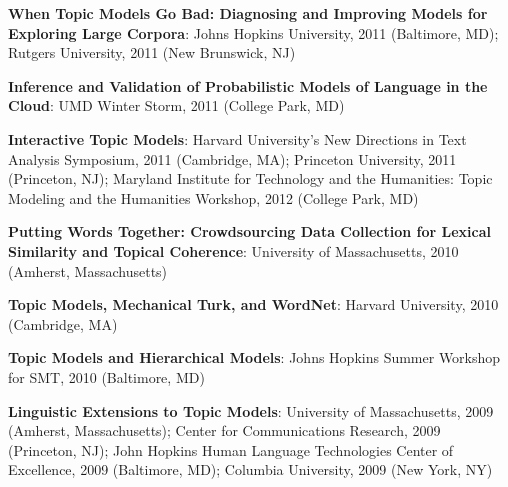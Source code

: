 \documentclass[10pt,a4paper]{article} %
\begin{document}
{\begin{enumerate*}
	\item {\bf When Topic Models Go Bad: Diagnosing and Improving Models for Exploring Large Corpora}: Johns Hopkins University, 2011 (Baltimore, MD); Rutgers University, 2011 (New Brunswick, NJ)
	\item {\bf Inference and Validation of Probabilistic Models of Language in the Cloud}: UMD Winter Storm, 2011 (College Park, MD)
	\item {\bf Interactive Topic Models}: Harvard University's New Directions in Text Analysis Symposium, 2011 (Cambridge, MA); Princeton University, 2011 (Princeton, NJ); Maryland Institute for Technology and the Humanities: Topic Modeling and the Humanities Workshop, 2012 (College Park, MD)
	\item {\bf Putting Words Together: Crowdsourcing Data Collection for Lexical Similarity and Topical Coherence}: University of Massachusetts, 2010 (Amherst, Massachusetts)
	\item {\bf Topic Models, Mechanical Turk, and WordNet}: Harvard University, 2010 (Cambridge, MA)
	\item {\bf Topic Models and Hierarchical Models}: Johns Hopkins Summer Workshop for SMT, 2010 (Baltimore, MD)
	\item {\bf Linguistic Extensions to Topic Models}: University of
          Massachusetts, 2009 (Amherst, Massachusetts); Center for
          Communications Research, 2009 (Princeton, NJ); John Hopkins Human
          Language Technologies Center of Excellence, 2009 (Baltimore, MD); Columbia University, 2009 (New York, NY)
\end{enumerate*}

}

\end{document}
